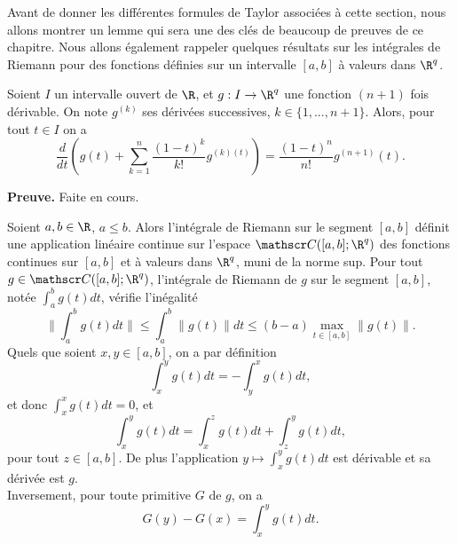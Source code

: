 \documentclass[class=report,crop=false]{standalone}
\begin{document}
Avant de donner les différentes formules de Taylor associées à cette section, nous allons montrer un lemme qui sera une des clés
de beaucoup de preuves de ce chapitre. Nous allons également rappeler quelques résultats sur les intégrales de Riemann pour
des fonctions définies sur un intervalle $[a,b]$ à valeurs dans $\R^q$.


\begin{lemme}\label{lemmeTaylor}
\textcolor[rgb]{0.44,0.00,0.87}{
  Soient $I$ un intervalle ouvert de $\R$,  et $g:I \rightarrow \R^q$ une fonction $(n+1)$ fois d\'erivable.
  On note $g^{(k)}$ ses d\'eriv\'ees successives, $k \in \{1,...,n+1\}$. Alors, pour tout $t \in I$
  on a
  \begin{equation*}
    \dfrac{d}{dt}\left(g(t)+ \displaystyle \sum_{k=1}^{n} \dfrac{(1-t)^k}{k!}g^{(k)(t)}\right)=\dfrac{(1-t)^n}{n!}g^{(n+1)}(t).
  \end{equation*}}
\end{lemme}

{\textbf{Preuve.}} Faite en cours.

\begin{proposition}
\textcolor[rgb]{0.44,0.00,0.87}{
  Soient $a,b \in \R$, $a \leq b$. Alors l'int\'egrale de Riemann sur le segment
  $[a,b]$ d\'efinit une application lin\'eaire continue sur l'espace $\co([a,b];\R^q)$ des fonctions continues sur $[a,b]$ et \`a valeurs
  dans $\R^q$, muni de la norme sup. Pour tout $g\in \co([a,b];\R^q)$, l'int\'egrale de Riemann de $g$ sur le segment $[a,b]$, not\'ee
  $\displaystyle \int_a^b g(t)dt$, v\'erifie l'in\'egalit\'e
  \begin{equation*}
    \|\displaystyle \int_a^b g(t)dt \| \leq \displaystyle \int_a^b \|g(t)\|dt \leq (b-a) \displaystyle \max_{t\in[a,b]}\|g(t)\|.
  \end{equation*}
  Quels que soient $x,y \in [a,b]$, on a par d\'efinition
  \begin{equation*}
    \displaystyle \int_x^y g(t)dt=-\displaystyle \int_y^x g(t)dt,
  \end{equation*}
  et donc $\displaystyle \int_x^x g(t)dt=0$, et
  \begin{equation*}
    \displaystyle \int_x^y g(t)dt= \displaystyle \int_x^z g(t)dt+ \displaystyle \int_z^y g(t)dt,
  \end{equation*}
  pour tout $z\in[a,b]$. De plus l'application $y \mapsto  \displaystyle \int_x^y g(t)dt$ est d\'erivable et sa d\'eriv\'ee
  est $g$. \\
  Inversement, pour toute primitive $G$ de $g$, on a
  \begin{equation*}
    G(y)-G(x)= \displaystyle \int_x^y g(t)dt.
  \end{equation*}}
\end{proposition}
\end{document}
